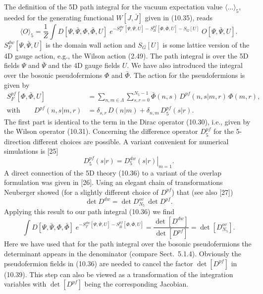 The definition of the 5D path integral for the vacuum expectation value
$\langle\ldots\rangle_5$, needed for the generating functional $W[J, \bar J]$
given in (10.35), reads
\begin{equation}
  \langle O\rangle_5 = \frac{1}{Z}
  \int D[\Psi, \bar\Psi, \Phi, \bar\Phi, U]\;
  e^{-S_F^{dw}[\Psi,\bar\Psi,U] - S_B^{pf}[\Phi,\bar\Phi,U] - S_G[U]}\;
  O[\Psi, \bar\Psi, U] .
\end{equation}
$S_F^{dw}[\Psi, \bar\Psi, U]$ is the domain wall action and $S_G[U]$ is some
lattice version of the 4D gauge action, e.g., the Wilson action (2.49). The
path integral is over the 5D fields $\Psi$ and $\bar\Psi$ and the 4D gauge
fields $U$. We have also introduced the integral over the bosonic
pseudofermions $\Phi$ and $\bar\Phi$. The action for the pseudofermions is
given by
\begin{equation}
  \begin{split}
    S_F^{pf}[\Phi, \bar\Phi, U] &=
    \sum_{n,m\in\Lambda}\sum_{s,r=0}^{N_5-1}
    \bar\Phi(n, s)\, D^{pf}(n, s|m, r)\, \Phi(m, r) , \\
    \text{with} \qquad D^{pf}(n, s|m, r) &= \delta_{s,r}\, D(n|m)
    + \delta_{n,m}\, D_5^{pf}(s|r) .
  \end{split}
\end{equation}
The first part is identical to the term in the Dirac operator (10.30), i.e.,
given by the Wilson operator (10.31). Concerning the difference operator
$D_5^{pf}$ for the 5-direction different choices are possible. A variant
convenient for numerical simulations is [25]
\begin{equation}
  D_5^{pf}(s|r) = \left. D_5^{dw}(s|r) \right|_{m=1} .
\end{equation}
A direct connection of the 5D theory (10.36) to a variant of the overlap
formulation was given in [26]. Using an elegant chain of transformations
Neuberger showed (for a slightly different choice of $D^{pf}$) that (see also
[27])
\begin{equation}
  \det D^{dw} = \det D_{N_5}^{ov}\, \det D^{pf} .
\end{equation}
Applying this result to our path integral (10.36) we find
\begin{equation}
  \int D[\Psi, \bar\Psi, \Phi, \bar\Phi]\;
  e^{-S_F^{dw}[\Psi,\bar\Psi,U] - S_B^{pf}[\Phi,\bar\Phi,U]}
  = \frac{\det[D^{dw}]}{\det[D^{pf}]}
  = \det\left[D_{N_5}^{ov}\right] .
\end{equation}
Here we have used that for the path integral over the bosonic pseudofermions
the determinant appears in the denominator (compare Sect.~5.1.4). Obviously
the pseudofermion fields in (10.36) are needed to cancel the factor
$\det[D^{pf}]$ in (10.39). This step can also be viewed as a transformation of
the integration variables with $\det[D^{pf}]$ being the corresponding
Jacobian.

